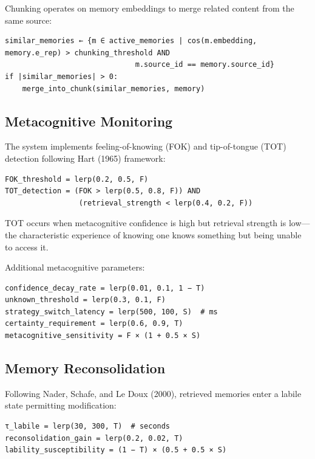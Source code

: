 \documentclass[
  letterpaper,
  DIV=11,
  numbers=noendperiod]{scrartcl}
\begin{document}
Chunking operates on memory embeddings to merge related content from the
same source:

\begin{verbatim}
similar_memories ← {m ∈ active_memories | cos(m.embedding, memory.e_rep) > chunking_threshold AND
                              m.source_id == memory.source_id}
if |similar_memories| > 0:
    merge_into_chunk(similar_memories, memory)
\end{verbatim}

\subsection{Metacognitive Monitoring}\label{metacognitive-monitoring}

The system implements feeling-of-knowing (FOK) and tip-of-tongue (TOT)
detection following Hart (1965) framework:

\begin{verbatim}
FOK_threshold = lerp(0.2, 0.5, F)
TOT_detection = (FOK > lerp(0.5, 0.8, F)) AND
                 (retrieval_strength < lerp(0.4, 0.2, F))
\end{verbatim}

TOT occurs when metacognitive confidence is high but retrieval strength
is low---the characteristic experience of knowing one knows something
but being unable to access it.

Additional metacognitive parameters:

\begin{verbatim}
confidence_decay_rate = lerp(0.01, 0.1, 1 − T)
unknown_threshold = lerp(0.3, 0.1, F)
strategy_switch_latency = lerp(500, 100, S)  # ms
certainty_requirement = lerp(0.6, 0.9, T)
metacognitive_sensitivity = F × (1 + 0.5 × S)
\end{verbatim}

\subsection{Memory Reconsolidation}\label{memory-reconsolidation}

Following Nader, Schafe, and Le Doux (2000), retrieved memories enter a
labile state permitting modification:

\begin{verbatim}
τ_labile = lerp(30, 300, T)  # seconds
reconsolidation_gain = lerp(0.2, 0.02, T)
lability_susceptibility = (1 − T) × (0.5 + 0.5 × S)
\end{verbatim}
\end{document}

